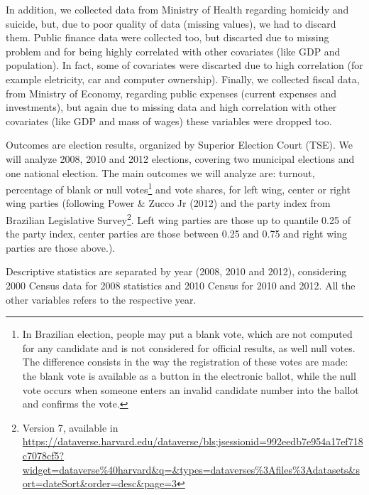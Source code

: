 \documentclass[12pt,]{article}
\let\rmarkdownfootnote\footnote%
\def\footnote{\protect\rmarkdownfootnote}
\begin{document}
In addition, we collected data from Ministry of Health regarding
homicidy and suicide, but, due to poor quality of data (missing values),
we had to discard them. Public finance data were collected too, but
discarted due to missing problem and for being highly correlated with
other covariates (like GDP and population). In fact, some of covariates
were discarted due to high correlation (for example eletricity, car and
computer ownership). Finally, we collected fiscal data, from Ministry of
Economy, regarding public expenses (current expenses and investments),
but again due to missing data and high correlation with other covariates
(like GDP and mass of wages) these variables were dropped too.

Outcomes are election results, organized by Superior Election Court
(TSE). We will analyze 2008, 2010 and 2012 elections, covering two
municipal elections and one national election. The main outcomes we will
analyze are: turnout, percentage of blank or null votes\footnote{In
  Brazilian election, people may put a blank vote, which are not
  computed for any candidate and is not considered for official results,
  as well null votes. The difference consists in the way the
  registration of these votes are made: the blank vote is available as a
  button in the electronic ballot, while the null vote occurs when
  someone enters an invalid candidate number into the ballot and
  confirms the vote.} and vote shares, for left wing, center or right
wing parties (following Power \& Zucco Jr (2012) and the party index
from Brazilian Legislative Survey\footnote{Version 7, available in
  \url{https://dataverse.harvard.edu/dataverse/bls;jsessionid=992eedb7e954a17ef718c7078cf5?widget=dataverse\%40harvard\&q=\&types=dataverses\%3Afiles\%3Adatasets\&sort=dateSort\&order=desc\&page=3}}.
Left wing parties are those up to quantile 0.25 of the party index,
center parties are those between 0.25 and 0.75 and right wing parties
are those above.).

Descriptive statistics are separated by year (2008, 2010 and 2012),
considering 2000 Census data for 2008 statistics and 2010 Census for
2010 and 2012. All the other variables refers to the respective year.
\end{document}
